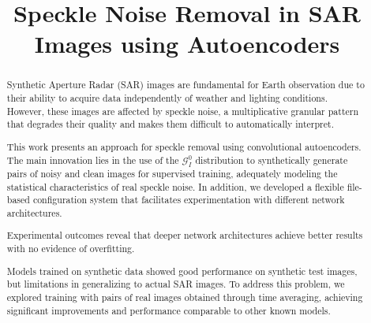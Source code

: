 \documentclass{llncs}
\begin{document}
%
\title{Speckle Noise Removal in SAR Images using Autoencoders}

%
%
%
%
\maketitle              %
%
\begin{abstract}
Synthetic Aperture Radar (SAR) images are fundamental for Earth observation due to their ability to acquire data independently of weather and lighting conditions. However, these images are affected by speckle noise, a multiplicative granular pattern that degrades their quality and makes them difficult to automatically interpret.

This work presents an approach for speckle removal using convolutional autoencoders. The main innovation lies in the use of the $\mathcal{G}_I^0$ distribution  to synthetically generate pairs of noisy and clean images for supervised training, adequately modeling the statistical characteristics of real speckle noise.
In addition, we developed a flexible file-based configuration system that facilitates experimentation with different network architectures.

Experimental outcomes reveal that deeper network architectures achieve better results with no evidence of overfitting.

Models trained on synthetic data showed good performance on synthetic test images, but limitations in generalizing to actual SAR images. To address this problem, we explored training with pairs of real images obtained through time averaging, achieving significant improvements and performance comparable to other known models.

\end{abstract}
\end{document}
